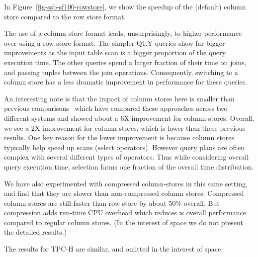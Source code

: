 In Figure~\ref{fig-ssb-sf100-rowstore}, we show the speedup of the (default) column store compared to the row store format.


The use of a column store format leads, unsurprisingly, to higher performance over using a row store format. %
The simpler Q1.Y queries show far bigger improvements as the input table scan is a bigger proportion of the query execution time. The other queries spend a larger fraction of their time on joins, and passing tuples between the join operations. Consequently, switching to a column store has a less dramatic improvement in performance for these queries.

An interesting note is that the impact of column stores here is  smaller than previous comparisons~\cite{AbadiMH08} which have compared these approaches across two different systems and showed about a 6X improvement for column-stores. Overall, we see a 2X improvement for column-stores, which is lower than these previous results.
One key reason for the lower improvement is because column stores typically help speed up scans (select operators).
However query plans are often complex with several different types of operators. 
Thus while considering overall query execution time, selection forms one fraction of the overall time distribution. 

We have also experimented with compressed column-stores in this same setting, and find that they are slower than non-compressed column stores. Compressed column stores are still faster than row store by about 50\% overall. But compression adds run-time CPU overhead which reduces is overall performance compared to regular column stores. 
(In the interest of space we do not present the detailed results.)

The results for TPC-H are similar, and omitted in the interest of space.



